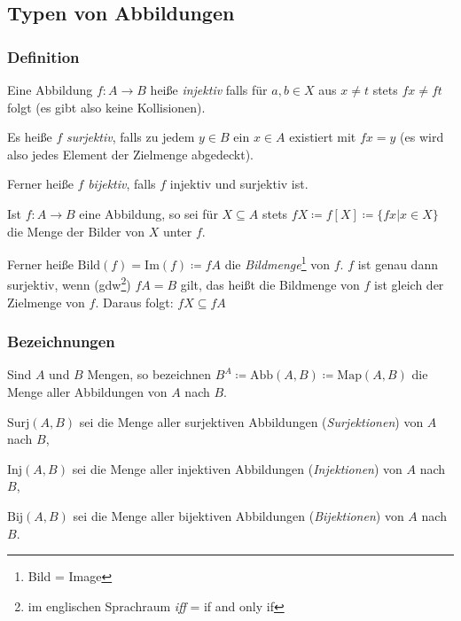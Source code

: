 \subsection{Typen von Abbildungen}\label{kap_typabb}
\subsubsection{Definition}
\begin{description}
\item Eine Abbildung $f \colon A \rightarrow B$ heiße \emph{injektiv} falls für
$a, b \in X$ aus $x \neq t$ stets $fx \neq ft$ folgt (es gibt also keine Kollisionen).
\item Es heiße $f$ \emph{surjektiv}, falls zu jedem $y \in B$ ein $x \in A$
existiert mit $fx = y$ (es wird also jedes Element der Zielmenge abgedeckt).
\item Ferner heiße $f$ \emph{bijektiv}, falls $f$ injektiv und surjektiv ist.
\end{description}
Ist $f \colon A \rightarrow B$ eine Abbildung, so sei für $X \subseteq A$ stets
$fX \coloneq f[X] \coloneq \{fx | x \in X\}$ die Menge der Bilder von $X$ unter
$f$.

Ferner heiße $\text{Bild}(f) = \text{Im}(f) \coloneq fA$ die
\emph{Bildmenge}\footnote{Bild = Image} von $f$. $f$ ist genau dann surjektiv,
wenn (gdw\footnote{im englischen Sprachraum \emph{iff} = if and only if}) $fA = B$
gilt, das heißt die Bildmenge von $f$ ist gleich der Zielmenge von $f$. Daraus
folgt: $fX \subseteq fA$

\subsubsection{Bezeichnungen}
\begin{description}
\item Sind $A$ und $B$ Mengen, so bezeichnen $B^A \coloneq \text{Abb}(A,B)
\coloneq \text{Map}(A,B)$ die Menge aller Abbildungen von $A$ nach $B$.
\item $\text{Surj}(A,B)$ sei die Menge aller surjektiven Abbildungen
(\emph{Surjektionen}) von $A$ nach $B$,
\item $\text{Inj}(A,B)$ sei die Menge aller injektiven Abbildungen
(\emph{Injektionen}) von $A$ nach $B$,
\item $\text{Bij}(A,B)$ sei die Menge aller bijektiven Abbildungen
(\emph{Bijektionen}) von $A$ nach $B$.
\end{description}

